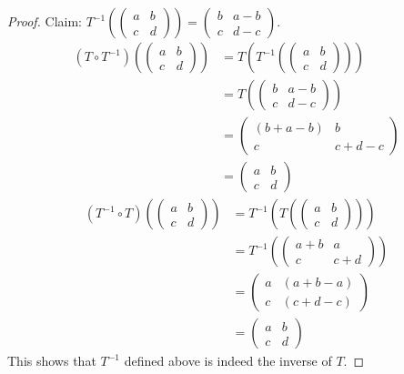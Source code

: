 \documentclass{article}
\begin{document}
\begin{proof}
Claim: $T^{-1}(\begin{pmatrix} a & b \\ c&d \end{pmatrix}) = \begin{pmatrix} b & a-b \\ c & d-c \end{pmatrix}$.
\begin{align*}
(T \circ T^{-1})(\begin{pmatrix} a & b \\ c&d \end{pmatrix}) &= T(T^{-1}(\begin{pmatrix} a & b \\ c&d \end{pmatrix})) \\
&= T(\begin{pmatrix} b & a-b \\ c & d-c \end{pmatrix}) \\
&= \begin{pmatrix} (b+a-b) & b \\ c & c+d-c \end{pmatrix} \\
&= \begin{pmatrix} a & b \\ c&d \end{pmatrix}
\end{align*}
\begin{align*}
(T^{-1} \circ T)(\begin{pmatrix} a & b \\ c&d \end{pmatrix}) &= T^{-1}(T(\begin{pmatrix} a & b \\ c&d \end{pmatrix})) \\
&= T^{-1}(\begin{pmatrix} a+b & a \\ c & c+d \end{pmatrix}) \\
&= \begin{pmatrix} a & (a+b-a) \\ c & (c+d -c) \end{pmatrix} \\
&= \begin{pmatrix} a & b \\ c&d \end{pmatrix}
\end{align*}
This shows that $T^{-1}$ defined above is indeed the inverse of $T$.
\end{proof}
\end{document}
